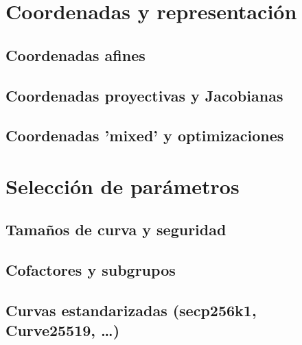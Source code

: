 \section{Coordenadas y representación}\label{sec:coordenadas_curvas_elipticas}
\subsection{Coordenadas afines}
\subsection{Coordenadas proyectivas y Jacobianas}
\subsection{Coordenadas 'mixed' y optimizaciones}

\section{Selección de parámetros}
\subsection{Tamaños de curva y seguridad}
\subsection{Cofactores y subgrupos}
\subsection{Curvas estandarizadas (secp256k1, Curve25519, …)}

